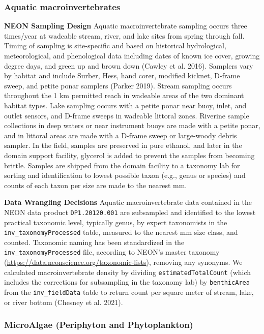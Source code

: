 \documentclass[
  12pt,
]{article}
\begin{document}
\hypertarget{aquatic-macroinvertebrates}{%
\subsubsection{Aquatic macroinvertebrates}\label{aquatic-macroinvertebrates}}

\textbf{NEON Sampling Design} Aquatic macroinvertebrate sampling occurs three times/year at wadeable stream, river, and lake sites from spring through fall. Timing of sampling is site-specific and based on historical hydrological, meteorological, and phenological data including dates of known ice cover, growing degree days, and green up and brown down (Cawley et al. 2016). Samplers vary by habitat and include Surber, Hess, hand corer, modified kicknet, D-frame sweep, and petite ponar samplers (Parker 2019). Stream sampling occurs throughout the 1 km permitted reach in wadeable areas of the two dominant habitat types. Lake sampling occurs with a petite ponar near buoy, inlet, and outlet sensors, and D-frame sweeps in wadeable littoral zones. Riverine sample collections in deep waters or near instrument buoys are made with a petite ponar, and in littoral areas are made with a D-frame sweep or large-woody debris sampler. In the field, samples are preserved in pure ethanol, and later in the domain support facility, glycerol is added to prevent the samples from becoming brittle. Samples are shipped from the domain facility to a taxonomy lab for sorting and identification to lowest possible taxon (e.g., genus or species) and counts of each taxon per size are made to the nearest mm.

\textbf{Data Wrangling Decisions} Aquatic macroinvertebrate data contained in the NEON data product \texttt{DP1.20120.001} are subsampled and identified to the lowest practical taxonomic level, typically genus, by expert taxonomists in the \texttt{inv\_taxonomyProcessed} table, measured to the nearest mm size class, and counted. Taxonomic naming has been standardized in the \texttt{inv\_taxonomyProcessed} file, according to NEON's master taxonomy (\url{https://data.neonscience.org/taxonomic-lists}), removing any synonyms. We calculated macroinvertebrate density by dividing \texttt{estimatedTotalCount} (which includes the corrections for subsampling in the taxonomy lab) by \texttt{benthicArea} from the \texttt{inv\_fieldData} table to return count per square meter of stream, lake, or river bottom (Chesney et al. 2021).

\hypertarget{microalgae-periphyton-and-phytoplankton}{%
\subsubsection{MicroAlgae (Periphyton and Phytoplankton)}\label{microalgae-periphyton-and-phytoplankton}}
\end{document}

